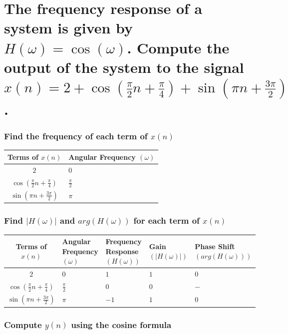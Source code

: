 \documentclass{article}
\newenvironment{directsubsubs}{
  \makeatletter
  \renewcommand\thesubsubsection{\thesection.\Roman{subsubsection}}
  \makeatother
}{
  \makeatletter
  \renewcommand\thesubsubsection{\thesubsection.\Roman{subsubsection}}
  \makeatother
}
\renewcommand{\thesubsection}{\thesection.\alph{subsection}}
\renewcommand{\thesubsubsection}{\thesection.\alph{subsection}.\Roman{subsubsection}}
\begin{document}
\begin{directsubsubs}

\section[Question ~\thesection]{The frequency response of a system is given by $H(\omega) = \cos{(\omega)}$. Compute the output of the system to the signal $x(n) = 2 + \cos{(\frac{\pi}{2}n + \frac{\pi}{4})} + \sin{({\pi}n + \frac{3\pi}{2})}$.}

\subsubsection[~\thesubsubsection]{Find the frequency of each term of $x(n)$}

\begin{tabularx}{\linewidth}{| c || Y |}
	\hline
	Terms of $x(n)$ & Angular Frequency $(\omega)$ \\
	\hline
	$2$ & $0$ \\
	$\cos{(\tfrac{\pi}{2}n + \tfrac{\pi}{4})}$ & $\tfrac{\pi}{2}$ \\
	$\sin{({\pi}n + \frac{3\pi}{2})}$ & $\pi$ \\
	\hline
\end{tabularx}

\subsubsection[~\thesubsubsection]{Find $|H(\omega)|$ and $arg(H(\omega))$ for each term of $x(n)$}

\begin{tabularx}{\linewidth}{| c || Y | Y | Y | Y|}
	\hline
	Terms of $x(n)$ & Angular Frequency $(\omega)$ & Frequency Response $(H(\omega))$ & Gain $(|H(\omega)|)$ & Phase Shift $(arg(H(\omega)))$ \\
	\hline
	$2$ & $0$ & $1$ & $1$ & $0$ \\
	$\cos{(\tfrac{\pi}{2}n + \tfrac{\pi}{4})}$ & $\tfrac{\pi}{2}$ & $0$ & $0$ & $-$ \\
	$\sin{({\pi}n + \tfrac{3\pi}{2})}$ & $\pi$ & $-1$ & $1$ & $0$ \\
	\hline
\end{tabularx}

\subsubsection[~\thesubsubsection]{Compute $y(n)$ using the cosine formula}


\end{directsubsubs}
\end{document}
